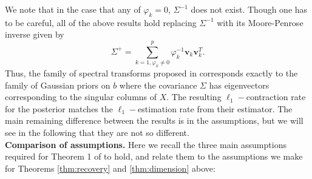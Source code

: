 \documentclass[11pt]{article}
\newcommand{\subparspace}{\vspace{3mm} \\}
\numberwithin{equation}{section}
\begin{document}
We note that in the case that any of $\varphi_k = 0$, $\Sigma^{-1}$ does not exist. Though one has to be careful, all of the above results hold replacing $\Sigma^{-1}$ with its Moore-Penrose inverse given by
 $$
 \Sigma^+ = \sum_{k = 1, \varphi_k \neq 0}^p \varphi_k^{-1} \mathbf{v}_k \mathbf{v}_k^T.
 $$
 Thus, the family of spectral transforms proposed in \cite{CBM2020} corresponds exactly to the family of Gaussian priors on $b$ where the covariance $\Sigma$ has eigenvectors corresponding to the singular columns of $X$. The resulting $\ell_1-$contraction rate for the posterior matches the $\ell_1-$estimation rate from their estimator. The main remaining difference between the results is in the assumptions, but we will see in the following that they are not so different. 
\subparspace
 {\bf Comparison of assumptions.} Here we recall the three main assumptions required for Theorem 1 of \cite{CBM2020} to hold, and relate them to the assumptions we make for Theorems \ref{thm:recovery} and \ref{thm:dimension} above:
\end{document}
